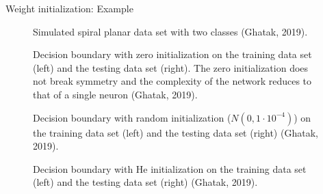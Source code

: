 \begin{vbframe}{Weight initialization: Example}
\begin{figure}
      \caption{Simulated spiral planar data set with two classes (Ghatak, 2019).}
  \end{figure}
  \framebreak
  \begin{figure}
    \centering
      \caption{Decision boundary with zero initialization on the training data set (left) and the testing data set (right). The zero initialization does not break symmetry and the complexity of the network reduces to that of a single
neuron (Ghatak, 2019).}
  \end{figure}
    \framebreak
  \begin{figure}
    \centering
      \caption{Decision boundary with random initialization ($N\left(0, 1\cdot 10 ^{-4}\right)$) on the training data set (left) and the testing data set (right) (Ghatak, 2019).}
  \end{figure}
      \framebreak
  \begin{figure}
    \centering
      \caption{Decision boundary with He initialization on the training data set (left) and the testing data set (right) (Ghatak, 2019).}
  \end{figure}
\end{vbframe}

